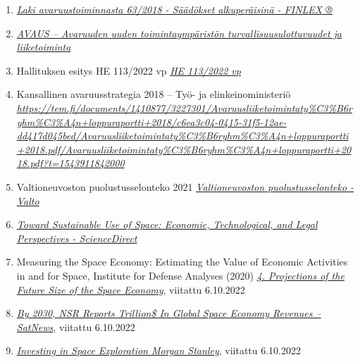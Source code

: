 \documentclass[nobib,finnish,oneside,openany,notoc,a4paper]{tufte-book}
\begin{document}
{\begin{enumerate}
\def\labelenumi{\arabic{enumi}.}
\item
  \href{https://www.finlex.fi/fi/laki/alkup/2018/20180063}{\emph{Laki
  avaruustoiminnasta 63/2018 - Säädökset alkuperäisinä - FINLEX ®}}
\item
  \href{https://julkaisut.valtioneuvosto.fi/bitstream/handle/10024/162062/VNTEAS_2020_08.pdf}{\emph{AVAUS
  -- Avaruuden uuden toimintaympäristön turvallisuusulottuvuudet ja
  liiketoiminta}}
\item
  Hallituksen esitys HE 113/2022 vp
  \href{https://www.eduskunta.fi/FI/vaski/HallituksenEsitys/Sivut/HE_113+2022.aspx}{\emph{HE
  113/2022 vp}}
\item
  Kansallinen avaruusstrategia 2018 -- Työ- ja elinkeinoministeriö\emph{
  }\href{https://tem.fi/documents/1410877/3227301/Avaruusliiketoimintaty\%C3\%B6ryhm\%C3\%A4n+loppuraportti+2018/c6ea3c04-0415-31f5-12ae-dd417d045bed/Avaruusliiketoimintaty\%C3\%B6ryhm\%C3\%A4n+loppuraportti+2018.pdf/Avaruusliiketoimintaty\%C3\%B6ryhm\%C3\%A4n+loppuraportti+2018.pdf?t=1543911842000}{\emph{https://tem.fi/documents/1410877/3227301/Avaruusliiketoimintaty\%C3\%B6ryhm\%C3\%A4n+loppuraportti+2018/c6ea3c04-0415-31f5-12ae-dd417d045bed/Avaruusliiketoimintaty\%C3\%B6ryhm\%C3\%A4n+loppuraportti+2018.pdf/Avaruusliiketoimintaty\%C3\%B6ryhm\%C3\%A4n+loppuraportti+2018.pdf?t=1543911842000}}
\item
  Valtioneuvoston puolustusselonteko 2021
  \href{http://urn.fi/URN:ISBN:978-952-383-820-8}{\emph{Valtioneuvoston
  puolustusselonteko - Valto}}
\item
  \href{https://www.sciencedirect.com/science/article/pii/S0265964621000205}{\emph{Toward
  Sustainable Use of Space: Economic, Technological, and Legal
  Perspectives - ScienceDirect}}
\item
  Measuring the Space Economy: Estimating the Value of Economic
  Activities in and for Space, Institute for Defense Analyses (2020)
  \href{https://www.jstor.org/stable/pdf/resrep25331.7.pdf}{\emph{4.
  Projections of the Future Size of the Space Economy}}, viitattu
  6.10.2022
\item
  \href{https://news.satnews.com/2022/01/27/by-2030-nsr-reports-trillion-in-global-space-economy-revenues/}{\emph{By
  2030, NSR Reports Trillion\$ In Global Space Economy Revenues --
  SatNews}}, viitattu 6.10.2022
\item
  \href{https://www.morganstanley.com/ideas/investing-in-space}{\emph{Investing
  in Space Exploration \textbar{} Morgan Stanley}}, viitattu 6.10.2022

\end{enumerate}}
\end{document}

